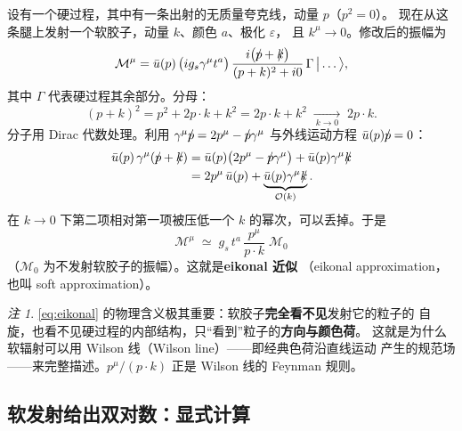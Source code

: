 \documentclass[UTF8,a4paper,11pt]{ctexart}
\theoremstyle{definition}
\theoremstyle{remark}
\newtheorem{remark}{注}[section]
\theoremstyle{plain}
\newcommand{\psl}{p\mkern-9.5mu/}
\newcommand{\ksl}{k\mkern-9.0mu/}
\newcommand{\en}[1]{\textsf{#1}}   %
\begin{document}
设有一个硬过程，其中有一条出射的无质量夸克线，动量 $p$（$p^2=0$）。
现在从这条腿上发射一个软胶子，动量 $k$、颜色 $a$、极化 $\varepsilon$，
且 $k^\mu\to0$。修改后的振幅为
\begin{equation}
  \mathcal M^{\mu}
  =\bar u(p)\,\big(ig_s\gamma^\mu t^a\big)\,
   \frac{i\big(\psl+\ksl\big)}{(p+k)^2+i0}\,\Gamma\,\big|\dots\big\rangle ,
  \label{eq:softamp1}
\end{equation}
其中 $\Gamma$ 代表硬过程其余部分。分母：
\begin{equation}
  (p+k)^2=p^2+2p\cdot k+k^2=2p\cdot k+k^2\;\xrightarrow[\ k\to0\ ]{}\;2p\cdot k .
\end{equation}
分子用 Dirac 代数处理。利用
$\gamma^\mu\psl=2p^\mu-\psl\gamma^\mu$ 与外线运动方程 $\bar u(p)\psl=0$：
\begin{align}
  \bar u(p)\,\gamma^\mu(\psl+\ksl)
  &=\bar u(p)\big(2p^\mu-\psl\gamma^\mu\big)+\bar u(p)\gamma^\mu\ksl
   \notag\\
  &=2p^\mu\,\bar u(p)+\underbrace{\bar u(p)\gamma^\mu\ksl}_{\mathcal O(k)} .
  \label{eq:eiknum}
\end{align}
在 $k\to0$ 下第二项相对第一项被压低一个 $k$ 的幂次，可以丢掉。于是
\begin{equation}
  \boxed{\;
  \mathcal M^\mu \;\simeq\;
  g_s\,t^a\,\frac{p^\mu}{p\cdot k}\;\mathcal M_0\;}
  \label{eq:eikonal}
\end{equation}
（$\mathcal M_0$ 为不发射软胶子的振幅）。这就是\textbf{eikonal 近似}
（\en{eikonal approximation}，也叫 soft approximation）。

\begin{remark}
\eqref{eq:eikonal} 的物理含义极其重要：软胶子\textbf{完全看不见}发射它的粒子的
自旋，也看不见硬过程的内部结构，只“看到”粒子的\textbf{方向与颜色荷}。
这就是为什么软辐射可以用 Wilson 线（\en{Wilson line}）——即经典色荷沿直线运动
产生的规范场——来完整描述。$p^\mu/(p\cdot k)$ 正是 Wilson 线的 Feynman 规则。
\end{remark}

\subsection{软发射给出双对数：显式计算}
\label{subsec:doublelog}
\end{document}

